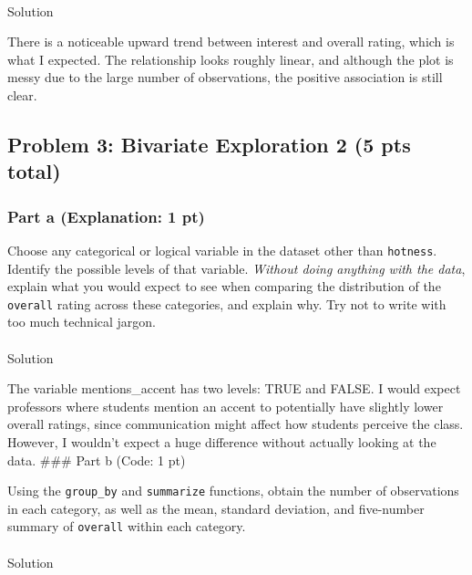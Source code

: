 \documentclass[
  letterpaper,
  DIV=11,
  numbers=noendperiod]{scrartcl}
\makeatletter
\let\oldparagraph\paragraph
\renewcommand{\paragraph}{
    \@ifstar
      \xxxParagraphStar
      \xxxParagraphNoStar
  }
\newcommand{\xxxParagraphStar}[1]{\oldparagraph*{#1}\mbox{}}
\newcommand{\xxxParagraphNoStar}[1]{\oldparagraph{#1}\mbox{}}
\makeatother
\begin{document}
\paragraph{Solution}\label{solution-7}

There is a noticeable upward trend between interest and overall rating,
which is what I expected. The relationship looks roughly linear, and
although the plot is messy due to the large number of observations, the
positive association is still clear.

\subsection{Problem 3: Bivariate Exploration 2 (5 pts
total)}\label{problem-3-bivariate-exploration-2-5-pts-total}

\subsubsection{Part a (Explanation: 1
pt)}\label{part-a-explanation-1-pt-2}

Choose any categorical or logical variable in the dataset other than
\texttt{hotness}. Identify the possible levels of that variable.
\emph{Without doing anything with the data}, explain what you would
expect to see when comparing the distribution of the \texttt{overall}
rating across these categories, and explain why. Try not to write with
too much technical jargon.

\paragraph{Solution}\label{solution-8}

The variable mentions\_accent has two levels: TRUE and FALSE. I would
expect professors where students mention an accent to potentially have
slightly lower overall ratings, since communication might affect how
students perceive the class. However, I wouldn't expect a huge
difference without actually looking at the data. \#\#\# Part b (Code: 1
pt)

Using the \texttt{group\_by} and \texttt{summarize} functions, obtain
the number of observations in each category, as well as the mean,
standard deviation, and five-number summary of \texttt{overall} within
each category.

\paragraph{Solution}\label{solution-9}
\end{document}
